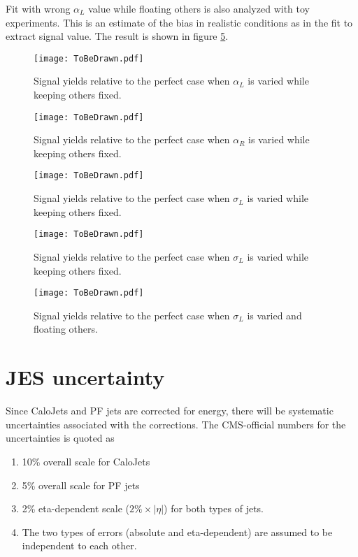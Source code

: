 \documentclass[10pt,a4paper,onecolumn]{article}
\begin{document}
Fit with wrong $\alpha_L$ value while floating others is also analyzed with toy experiments.
This is an estimate of the bias in realistic conditions as in the fit to extract signal value.
The result is shown in figure \ref{Figure_RelativeYieldChangingAlphaLFloatingOthers}.

\begin{figure}
\texttt{[image: ToBeDrawn.pdf]}
\caption{Signal yields relative to the perfect case when $\alpha_L$ is varied while keeping others fixed.}
\label{Figure_RelativeYieldChangingAlphaLOnly}
\end{figure}

\begin{figure}
\texttt{[image: ToBeDrawn.pdf]}
\caption{Signal yields relative to the perfect case when $\alpha_R$ is varied while keeping others fixed.}
\label{Figure_RelativeYieldChangingAlphaROnly}
\end{figure}

\begin{figure}
\texttt{[image: ToBeDrawn.pdf]}
\caption{Signal yields relative to the perfect case when $\sigma_L$ is varied while keeping others fixed.}
\label{Figure_RelativeYieldChangingSigmaLOnly}
\end{figure}

\begin{figure}
\texttt{[image: ToBeDrawn.pdf]}
\caption{Signal yields relative to the perfect case when $\sigma_L$ is varied while keeping others fixed.}
\label{Figure_RelativeYieldChangingSigmaROnly}
\end{figure}

\begin{figure}
\texttt{[image: ToBeDrawn.pdf]}
\caption{Signal yields relative to the perfect case when $\sigma_L$ is varied and floating others.}
\label{Figure_RelativeYieldChangingAlphaLFloatingOthers}
\end{figure}


\section{JES uncertainty}

Since CaloJets and PF jets are corrected for energy, there will be systematic uncertainties associated with the corrections.
The CMS-official numbers for the uncertainties is quoted as

\begin{enumerate}
\item 10\% overall scale for CaloJets
\item 5\% overall scale for PF jets
\item 2\% eta-dependent scale ($2\% \times |\eta|$) for both types of jets.
\item The two types of errors (absolute and eta-dependent) are assumed to be independent to each other.
\end{enumerate}
\end{document}
